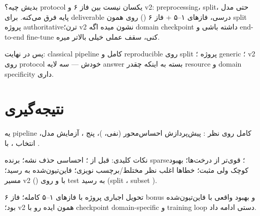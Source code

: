 \documentclass[a4paper,11pt]{article}
\begin{document}
بدیش چیه؟ protocol یکسان نیست بین فاز ۶ و v2: preprocessing، split، حتی مدل پایه فرق می‌کنه. برای deliverable درسی، فازهای ۱–۵ + فاز ۶ () روی همون split پروژه authoritative‌ترن؛ v2 نشون میده اگه domain checkpoint داشته باشی و end-to-end fine-tune کنی، سقف عملی خیلی بالاتر میره.

پس در نهایت: classical pipeline کامل و reproducible روی split پروژه ؛  generic ؛  v2  روی protocol خودش — سه لایه answer بسته به اینکه چقدر resource و domain specificity داری.


\section{نتیجه‌گیری}

یه pipeline کامل روی  نظر : پیش‌پردازش احساس‌محور (نفی، )، پنج ،  آزمایش مدل، انتخاب ،  با .

نکات کلیدی:  قبل از ؛  احساسی حذف نشه؛  برنده sparse؛  قوی‌تر از درخت‌ها؛  بهبود کوچک ولی مثبت؛ خطاها اغلب نظر مختلط/برچسب نویزی؛  فاین‌تیون‌شده به  رسید؛ مسیر v2 () با  و  روی test به  رسید (split ، subset ).

تحویل اجباری پروژه با فازهای ۱–۵ کامله؛ فاز ۶ bonus و بهبود واقعی با  فاین‌تیون‌شده بود؛ v2 همون ایده رو با checkpoint domain-specific و training loop دستی ادامه داد.
\end{document}
